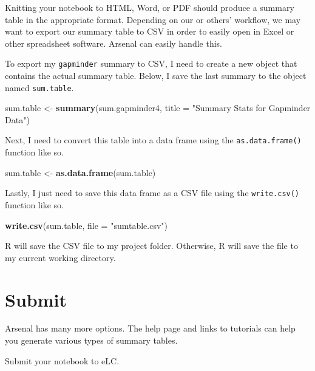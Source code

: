 \documentclass[
]{book}
\newenvironment{Shaded}{\begin{snugshade}}{\end{snugshade}}
\newcommand{\DataTypeTok}[1]{\textcolor[rgb]{0.13,0.29,0.53}{#1}}
\newcommand{\KeywordTok}[1]{\textcolor[rgb]{0.13,0.29,0.53}{\textbf{#1}}}
\newcommand{\NormalTok}[1]{#1}
\newcommand{\StringTok}[1]{\textcolor[rgb]{0.31,0.60,0.02}{#1}}
\begin{document}
Knitting your notebook to HTML, Word, or PDF should produce a summary table in the appropriate format. Depending on our or others' workflow, we may want to export our summary table to CSV in order to easily open in Excel or other spreadsheet software. Arsenal can easily handle this.

To export my \texttt{gapminder} summary to CSV, I need to create a new object that contains the actual summary table. Below, I save the last summary to the object named \texttt{sum.table}.

\begin{Shaded}
\begin{Highlighting}[]
\NormalTok{sum.table <-}\StringTok{ }\KeywordTok{summary}\NormalTok{(sum.gapminder4, }\DataTypeTok{title =} \StringTok{"Summary Stats for Gapminder Data"}\NormalTok{)}
\end{Highlighting}
\end{Shaded}

Next, I need to convert this table into a data frame using the \texttt{as.data.frame()} function like so.

\begin{Shaded}
\begin{Highlighting}[]
\NormalTok{sum.table <-}\StringTok{ }\KeywordTok{as.data.frame}\NormalTok{(sum.table)}
\end{Highlighting}
\end{Shaded}

Lastly, I just need to save this data frame as a CSV file using the \texttt{write.csv()} function like so.

\begin{Shaded}
\begin{Highlighting}[]
\KeywordTok{write.csv}\NormalTok{(sum.table, }\DataTypeTok{file =} \StringTok{"sumtable.csv"}\NormalTok{)}
\end{Highlighting}
\end{Shaded}

R will save the CSV file to my project folder. Otherwise, R will save the file to my current working directory.

\hypertarget{submit}{%
\section{Submit}\label{submit}}

Arsenal has many more options. The help page and links to tutorials can help you generate various types of summary tables.

Submit your notebook to eLC.
\end{document}
